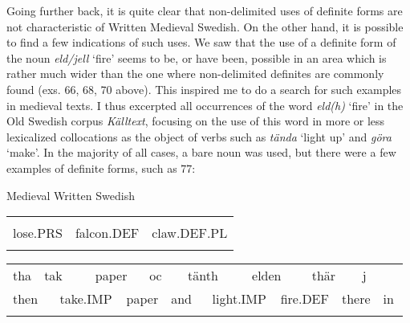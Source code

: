 \begin{styleBodytextC}
Going further back, it is quite clear that non-delimited uses of definite forms are not characteristic of Written Medieval Swedish. On the other hand, it is possible to find a few indications of such uses. We saw that the use of a definite form of the noun \textit{eld/jell} ‘fire’ seems to be, or have been, possible in an area which is rather much wider than the one where non-delimited definites are commonly found (exs. 66, 68, 70 above). This inspired me to do a search for such examples in medieval texts. I thus excerpted all occurrences of the word \textit{eld(h)} ‘fire’ in the Old Swedish corpus \textit{Källtext}, focusing on the use of this word in more or less lexicalized collocations as the object of verbs such as \textit{tända} ‘light up’ and \textit{göra} ‘make’. In the majority of all cases, a bare noun was used, but there were a few examples of definite forms, such as 77:

\end{styleBodytextC}

\begin{listWWNumileveli}
\item {}

\begin{styleExample}
\label{bkm:Ref64457141}Medieval Written Swedish

\end{styleExample}

\end{listWWNumileveli}

\begin{tabular}{lll}
\lsptoprule
\multicolumn{3}{l}{Misther

}\\
lose.PRS & falcon.DEF & claw.DEF.PL\\
\lspbottomrule
\end{tabular}

\begin{tabular}{llllllllllllllll}
\lsptoprule
tha & \multicolumn{2}{l}{tak

} & \multicolumn{2}{l}{paper

} & \multicolumn{2}{l}{oc

} & \multicolumn{2}{l}{tänth

} & \multicolumn{2}{l}{elden

} & \multicolumn{2}{l}{thär

} & \multicolumn{2}{l}{j

} & \\
\multicolumn{2}{l}{then

} & \multicolumn{2}{l}{take.IMP

} & \multicolumn{2}{l}{paper

} & \multicolumn{2}{l}{and

} & \multicolumn{2}{l}{light.IMP

} & \multicolumn{2}{l}{fire.DEF

} & \multicolumn{2}{l}{there 

} & \multicolumn{2}{l}{in

}\\
\lspbottomrule
\end{tabular}

